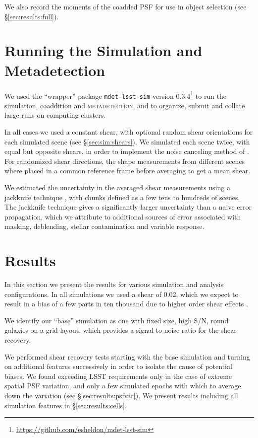 \documentclass[twocolumn,twocolappendix,astrosym]{openjournal}
\newcommand{\mdet}{\textsc{metadetection}}
\newcommand{\mshear}{0.02}
\begin{document}
We also record the moments of the coadded PSF for use in object selection (see
\S \ref{sec:results:full}).


\section{Running the Simulation and Metadetection} \label{sec:running}

We used the ``wrapper'' package \texttt{mdet-lsst-sim} version
0.3.4\footnote{\url{https://github.com/esheldon/mdet-lsst-sim}} to run the
simulation, coaddition and \mdet, and to organize, submit and collate large
runs on computing clusters.

In all cases we used a constant shear, with optional random shear orientations
for each simulated scene (see \S \ref{sec:sim:shears}).  We simulated each
scene twice, with equal but opposite shears, in order to implement the noise
canceling method of \cite{pujol2019}.  For randomized shear directions, the
shape measurements from different scenes where placed in a common reference
frame before averaging to get a mean shear.

We estimated the uncertainty in the averaged shear measurements using a
jackknife technique \citep{LuptonStats1993}, with chunks defined as a few tens
to hundreds of scenes.  The jackknife technique gives a significantly larger
uncertainty than a naive error propagation, which we attribute to additional
sources of error associated with masking, deblending, stellar contamination and
variable response.

\section{Results} \label{sec:results}

In this section we present the results for various simulation and analysis
configurations.  In all simulations we used a shear of \mshear, which we expect
to result in a bias of a few parts in ten thousand due to higher order
shear effects \citep{SheldonMcal2017,mdet20}.

We identify our ``base'' simulation as one with fixed size, high S/N, round
galaxies on a grid layout, which provides a signal-to-noise ratio for the shear
recovery.

We performed shear recovery tests starting with the base simulation and turning
on additional features successively in order to isolate the cause of potential
biases.  We found exceeding LSST requirements only in the case of extreme
spatial PSF variation, and only a few simulated epochs with which to average
down the variation (see \S \ref{sec:results:psfvar}).  We present results
including all simulation features in \S \ref{sec:results:cells}.
\end{document}
